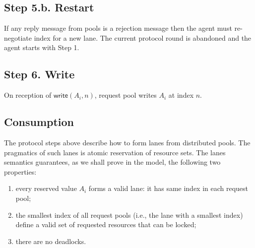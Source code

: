 \documentclass[11pt,parskip=half]{scrartcl} %
\begin{document}
	\subsection*{Step 5.b. Restart}
	
	If any reply message from pools is a rejection message then the agent must re-negotiate index for a new lane. The current protocol round is abandoned and the agent starts with Step 1. 
	
	\subsection*{Step 6. Write}
	
	On reception of $\mathsf{write}(A_i, n)$, request pool writes $A_i$ at index $n$.
	
	
	\subsection*{Consumption}
	
	The protocol steps above describe how to form lanes from distributed pools. The pragmatics of such lanes is atomic reservation of resource sets. The lanes semantics guarantees, as we shall prove in the model, the following two properties:
	
	\begin{enumerate}
		\item every reserved value $A_i$ forms a valid lane: it has same index in each request pool;
		\item the smallest index of all request pools (i.e., the lane with a smallest index) define a valid set of requested resources that can be locked;
		\item there are no deadlocks.
	\end{enumerate}
	
	
	
\end{document}
